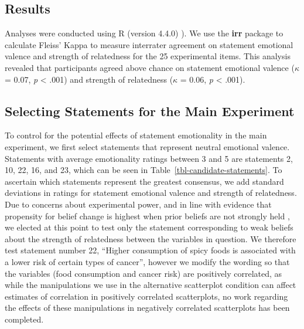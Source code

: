 \documentclass[sigconf]{acmart}
\begin{document}
\subsection{Results}\label{sec-results-pre}

Analyses were conducted using R (version 4.4.0) \citep{rcore}). We use
the \textbf{irr} package to calculate Fleiss' Kappa to measure
interrater agreement on statement emotional valence and strength of
relatedness for the 25 experimental items. This analysis revealed that
participants agreed above chance on statement emotional valence
(\(\kappa\) = 0.07, \emph{p} \textless{} .001) and strength of
relatedness (\(\kappa\) = 0.06, \emph{p} \textless{} .001).

\subsection{Selecting Statements for the Main
Experiment}\label{sec-selecting-statements}

To control for the potential effects of statement emotionality in the
main experiment, we first select statements that represent neutral
emotional valence. Statements with average emotionality ratings between
3 and 5 are statements 2, 10, 22, 16, and 23, which can be seen in
Table~\ref{tbl-candidate-statements}. To ascertain which statements
represent the greatest consensus, we add standard deviations in ratings
for statement emotional valence and strength of relatedness. Due to
concerns about experimental power, and in line with evidence that
propensity for belief change is highest when prior beliefs are not
strongly held \citep{xiong_2022, markant_2023}, we elected at this point
to test only the statement corresponding to weak beliefs about the
strength of relatedness between the variables in question. We therefore
test statement number 22, ``Higher consumption of spicy foods is
associated with a lower risk of certain types of cancer'', however we
modify the wording so that the variables (food consumption and cancer
risk) are positively correlated, as while the manipulations we use in
the alternative scatterplot condition can affect estimates of
correlation in positively correlated scatterplots, no work regarding the
effects of these manipulations in negatively correlated scatterplots has
been completed.
\end{document}
